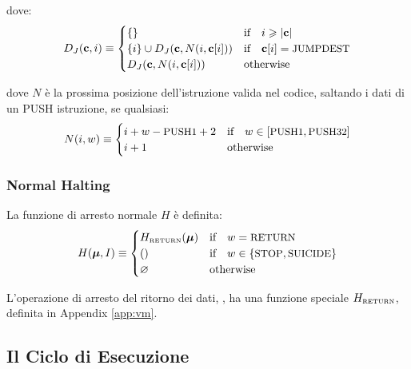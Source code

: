 \documentclass[9pt,oneside]{amsart}
\begin{document}
\begin{multicols}{2}
dove:
\begin{equation}
D_J(\mathbf{c}, i) \equiv \begin{cases}
\{\} & \text{if} \quad i \geqslant |\mathbf{c}|  \\
\{ i \} \cup D_J(\mathbf{c}, N(i, \mathbf{c}[i])) & \text{if} \quad \mathbf{c}[i] = \text{\small JUMPDEST} \\
D_J(\mathbf{c}, N(i, \mathbf{c}[i])) & \text{otherwise} \\
\end{cases}
\end{equation}

dove $N$ è la prossima posizione dell'istruzione valida nel codice, saltando i dati di un {\small PUSH} istruzione, se qualsiasi:
\begin{equation}
N(i, w) \equiv \begin{cases}
i + w - \text{\small PUSH1} + 2 & \text{if} \quad w \in [\text{\small PUSH1}, \text{\small PUSH32}] \\
i + 1 & \text{otherwise} \end{cases}
\end{equation}

\subsubsection{Normal Halting}

La funzione di arresto normale $H$ è definita:
\begin{equation}
H(\boldsymbol{\mu}, I) \equiv \begin{cases}
H_{\text{\tiny RETURN}}(\boldsymbol{\mu}) & \text{if} \quad w = \text{\small RETURN} \\
() & \text{if} \quad w \in \{ \text{\small STOP}, \text{\small SUICIDE} \} \\
\varnothing & \text{otherwise}
\end{cases}
\end{equation}

L'operazione di arresto del ritorno dei dati, , ha una funzione speciale $H_{\text{\tiny RETURN}}$, definita in Appendix \ref{app:vm}.

\subsection{Il Ciclo di Esecuzione}


\end{multicols}
\end{document}
